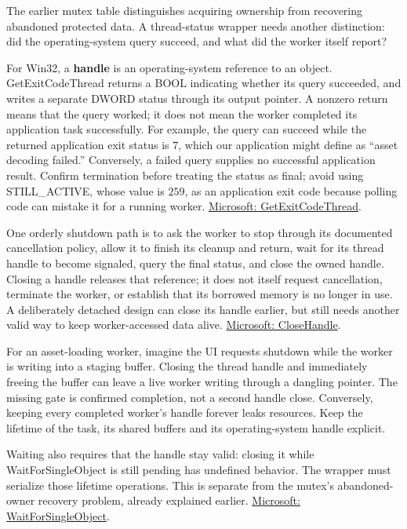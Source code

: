 \hypertarget{05-engine-i-ch013-query-success-worker-completion-and-handle-lifetime-are-separate-states}{}

The earlier mutex table distinguishes acquiring ownership from recovering abandoned protected data. A thread-status wrapper needs another distinction: did the operating-system query succeed, and what did the worker itself report?

For Win32, a \textbf{handle} is an operating-system reference to an object. GetExitCodeThread returns a BOOL indicating whether its query succeeded, and writes a separate DWORD status through its output pointer. A nonzero return means that the query worked; it does not mean the worker completed its application task successfully. For example, the query can succeed while the returned application exit status is \(7\), which our application might define as ``asset decoding failed.'' Conversely, a failed query supplies no successful application result. Confirm termination before treating the status as final; avoid using STILL\_ACTIVE, whose value is \(259\), as an application exit code because polling code can mistake it for a running worker. \href{https://learn.microsoft.com/en-us/windows/win32/api/processthreadsapi/nf-processthreadsapi-getexitcodethread}{Microsoft: GetExitCodeThread}.

One orderly shutdown path is to ask the worker to stop through its documented cancellation policy, allow it to finish its cleanup and return, wait for its thread handle to become signaled, query the final status, and close the owned handle. Closing a handle releases that reference; it does not itself request cancellation, terminate the worker, or establish that its borrowed memory is no longer in use. A deliberately detached design can close its handle earlier, but still needs another valid way to keep worker-accessed data alive. \href{https://learn.microsoft.com/en-us/windows/win32/api/handleapi/nf-handleapi-closehandle}{Microsoft: CloseHandle}.

For an asset-loading worker, imagine the UI requests shutdown while the worker is writing into a staging buffer. Closing the thread handle and immediately freeing the buffer can leave a live worker writing through a dangling pointer. The missing gate is confirmed completion, not a second handle close. Conversely, keeping every completed worker's handle forever leaks resources. Keep the lifetime of the task, its shared buffers and its operating-system handle explicit.

Waiting also requires that the handle stay valid: closing it while WaitForSingleObject is still pending has undefined behavior. The wrapper must serialize those lifetime operations. This is separate from the mutex's abandoned-owner recovery problem, already explained earlier. \href{https://learn.microsoft.com/en-us/windows/win32/api/synchapi/nf-synchapi-waitforsingleobject}{Microsoft: WaitForSingleObject}.

